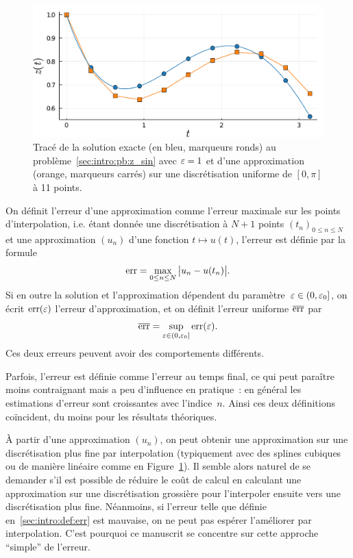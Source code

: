 \begin{figure}[!ht]
    \centering
    \includegraphics[width=.9\textwidth]{./Presentation/approx_sin.pdf}
    \caption{Tracé de la solution exacte (en bleu, marqueurs ronds) au problème~\eqref{sec:intro:pb:z_sin} avec $\varepsilon = 1$ et d'une approximation (orange, marqueurs carrés) sur une discrétisation uniforme de $[0,\pi]$ à 11 points.}
    \label{sec:intro:fig:approx_sin}
\end{figure}


\begin{FRdefinition*}
    On définit l'erreur d'une approximation comme l'erreur maximale sur les points d'interpolation, i.e. étant donnée une discrétisation à $N+1$ points $(t_n)_{0 \leq n \leq N}$ et une approximation $(u_n)$ d'une fonction $t \mapsto u(t)$, l'erreur est définie par la formule 
    \begin{equation} \label{sec:intro:def:err}
        \operatorname{err} = \max_{0 \leq n \leq N}\big| u_n - u(t_n) \big| .
    \end{equation}
    Si en outre la solution et l'approximation dépendent du paramètre~$\varepsilon \in (0,\varepsilon_0]$, on écrit $\operatorname{err}(\varepsilon)$ l'erreur d'approximation, et on définit l'erreur uniforme $\overline{\operatorname{err}}$ par 
    \begin{equation}
        \overline{\operatorname{err}} = \sup_{\varepsilon \in (0,\varepsilon_0]} \operatorname{err}(\varepsilon) .
    \end{equation}
    Ces deux erreurs peuvent avoir des comportements différents.
\end{FRdefinition*}
Parfois, l'erreur est définie comme l'erreur au temps final, ce qui peut paraître moins contraignant mais a peu d'influence en pratique~: en général les estimations d'erreur sont croissantes avec l'indice~$n$. Ainsi ces deux définitions coïncident, du moins pour les résultats théoriques.

\begin{FRremark*}
    À partir d'une approximation $(u_n)$, on peut obtenir une approximation sur une discrétisation plus fine par interpolation (typiquement avec des splines cubiques ou de manière linéaire comme en Figure~\ref{sec:intro:fig:approx_sin}). Il semble alors naturel de se demander s'il est possible de réduire le coût de calcul en calculant une approximation sur une discrétisation grossière pour l'interpoler ensuite vers une discrétisation plus fine. Néanmoins, si l'erreur telle que définie en~\eqref{sec:intro:def:err} est mauvaise, on ne peut pas espérer l'améliorer par interpolation. C'est pourquoi ce manuscrit se concentre sur cette approche \enquote{simple} de l'erreur.
\end{FRremark*}

